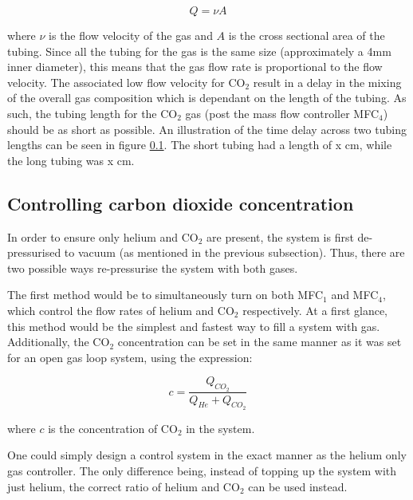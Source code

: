 \begin{equation}
    Q = \nu A
    \label{eq:volumetric_flow_rate}
\end{equation}

where $\nu$ is the flow velocity of the gas and $A$ is the cross sectional area of the tubing. Since all the tubing for the gas is the same size (approximately a 4mm inner diameter), this means that the gas flow rate is proportional to the flow velocity. The associated low flow velocity for CO$_2$ result in a delay in the mixing of the overall gas composition which is dependant on the length of the tubing. As such, the tubing length for the CO$_2$ gas (post the mass flow controller MFC$_4$) should be as short as possible. An illustration of the time delay across two tubing lengths can be seen in figure \ref{}. The short tubing had a length of x cm, while the long tubing was x cm.


\pagebreak

\subsection{Controlling carbon dioxide concentration}

In order to ensure only helium and CO$_2$ are present, the system is first de-pressurised to vacuum (as mentioned in the previous subsection). Thus, there are two possible ways re-pressurise the system with both gases. 

The first method would be to simultaneously turn on both MFC$_1$ and MFC$_4$, which control the flow rates of helium and CO$_2$ respectively. At a first glance, this method would be the simplest and fastest way to fill a system with gas. Additionally, the CO$_2$ concentration can be set in the same manner as it was set for an open gas loop system, using the expression:

\begin{equation}
    c = \frac{Q_{CO_2}}{Q_{He} + Q_{CO_2}}
    \label{eq:co2_concentration_open_gas_loop}
\end{equation}

where $c$ is the concentration of CO$_2$ in the system.

One could simply design a control system in the exact manner as the helium only gas controller. The only difference being, instead of topping up the system with just helium, the correct ratio of helium and CO$_2$ can be used instead. 

